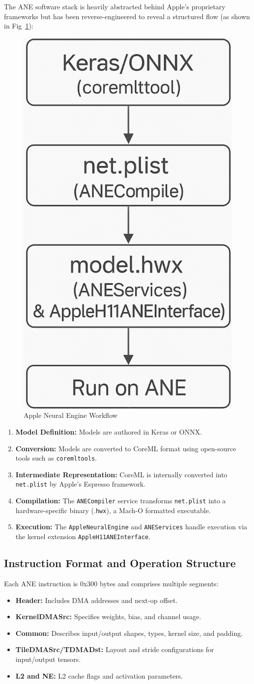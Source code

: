 The ANE software stack is heavily abstracted behind Apple's proprietary frameworks but has been reverse-engineered to reveal a structured flow (as shown in Fig~\ref{fig:ane-workflow}):
\begin{figure}[h]
    \centering
    \includegraphics[width=0.25\linewidth]{images/ane-workflow.jpg}
    \caption{Apple Neural Engine Workflow}
    \label{fig:ane-workflow}
\end{figure}

\begin{enumerate}
  \item \textbf{Model Definition:} Models are authored in Keras or ONNX.
  \item \textbf{Conversion:} Models are converted to CoreML format using open-source tools such as \texttt{coremltools}.
  \item \textbf{Intermediate Representation:} CoreML is internally converted into \texttt{net.plist} by Apple's Espresso framework.
  \item \textbf{Compilation:} The \texttt{ANECompiler} service transforms \texttt{net.plist} into a hardware-specific binary (.\texttt{hwx}), a Mach-O formatted executable.
  \item \textbf{Execution:} The \texttt{AppleNeuralEngine} and \texttt{ANEServices} handle execution via the kernel extension \texttt{AppleH11ANEInterface}.
\end{enumerate}


\subsection{Instruction Format and Operation Structure}

Each ANE instruction is 0x300 bytes and comprises multiple segments:

\begin{itemize}
  \item \textbf{Header:} Includes DMA addresses and next-op offset.
  \item \textbf{KernelDMASrc:} Specifies weights, bias, and channel usage.
  \item \textbf{Common:} Describes input/output shapes, types, kernel size, and padding.
  \item \textbf{TileDMASrc/TDMADst:} Layout and stride configurations for input/output tensors.
  \item \textbf{L2 and NE:} L2 cache flags and activation parameters.
\end{itemize}


